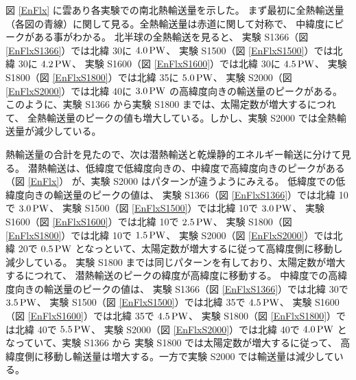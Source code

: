 \documentclass[body]{subfiles}
\begin{document}
図 \ref{EnFlx} に雲あり各実験での南北熱輸送量を示した。
まず最初に全熱輸送量（各図の青線）に関して見る。全熱輸送量は赤道に関して対称で、
中緯度にピークがある事がわかる。
北半球の全熱輸送を見ると、
実験 S1366（図 \ref{EnFlxS1366}）では北緯 30\textdegree に \(4.0\hmu{PW}\)、
実験 S1500（図 \ref{EnFlxS1500}）では北緯 30\textdegree に \(4.2\hmu{PW}\)、
実験 S1600（図 \ref{EnFlxS1600}）では北緯 30\textdegree に \(4.5\hmu{PW}\)、
実験 S1800（図 \ref{EnFlxS1800}）では北緯 35\textdegree に \(5.0\hmu{PW}\)、
実験 S2000（図 \ref{EnFlxS2000}）では北緯 40\textdegree に \(3.0\hmu{PW}\)
の高緯度向きの輸送量のピークがある。
このように、実験 S1366 から実験 S1800 までは、太陽定数が増大するにつれて、
全熱輸送量のピークの値も増大している。しかし、実験 S2000 では全熱輸送量が減少している。

熱輸送量の合計を見たので、次は潜熱輸送と乾燥静的エネルギー輸送に分けて見る。
潜熱輸送は、低緯度で低緯度向きの、中緯度で高緯度向きのピークがある（図 \ref{EnFlx}）
が、実験 S2000 はパターンが違うようにみえる。
低緯度での低緯度向きの輸送量のピークの値は、
実験 S1366（図 \ref{EnFlxS1366}）では北緯 10\textdegree で \(3.0\hmu{PW}\)、
実験 S1500（図 \ref{EnFlxS1500}）では北緯 10\textdegree で \(3.0\hmu{PW}\)、
実験 S1600（図 \ref{EnFlxS1600}）では北緯 10\textdegree で \(2.5\hmu{PW}\)、
実験 S1800（図 \ref{EnFlxS1800}）では北緯 10\textdegree で \(1.5\hmu{PW}\)、
実験 S2000（図 \ref{EnFlxS2000}）では北緯 20\textdegree で \(0.5\hmu{PW}\)
となっといて、太陽定数が増大するに従って高緯度側に移動し減少している。
実験 S1800 までは同じパターンを有しており、太陽定数が増大するにつれて、
潜熱輸送のピークの緯度が高緯度に移動する。
中緯度での高緯度向きの輸送量のピークの値は、
実験 S1366（図 \ref{EnFlxS1366}）では北緯 30\textdegree で \(3.5\hmu{PW}\)、
実験 S1500（図 \ref{EnFlxS1500}）では北緯 35\textdegree で \(4.5\hmu{PW}\)、
実験 S1600（図 \ref{EnFlxS1600}）では北緯 35\textdegree で \(4.5\hmu{PW}\)、
実験 S1800（図 \ref{EnFlxS1800}）では北緯 40\textdegree で \(5.5\hmu{PW}\)、
実験 S2000（図 \ref{EnFlxS2000}）では北緯 40\textdegree で \(4.0\hmu{PW}\)
となっていて、実験 S1366 から 実験 S1800 では太陽定数が増大するに従って、
高緯度側に移動し輸送量は増大する。一方で実験 S2000 では輸送量は減少している。
\end{document}
